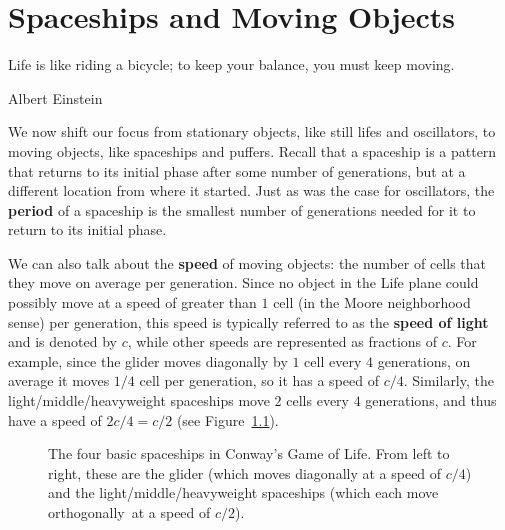 
\renewcommand{\chapterfolder}{spaceships/}
\chapter{Spaceships and Moving Objects}\label{chp:spaceships}


\vspace*{-0.4in}
\epigraph{Life is like riding a bicycle; to keep your balance, you must keep moving.}{Albert Einstein}
\vspace*{0.4in}


\noindent We now shift our focus from stationary objects, like still lifes and oscillators, to moving objects, like spaceships and puffers. Recall that a spaceship is a pattern that returns to its initial phase after some number of generations, but at a different location from where it started. Just as was the case for oscillators, the \textbf{period} of a spaceship is the smallest number of generations needed for it to return to its initial phase.

We can also talk about the \textbf{speed} of moving objects: the number of cells that they move on average per generation. Since no object in the Life plane could possibly move at a speed of greater than $1$ cell (in the Moore neighborhood sense) per generation, this speed is typically referred to as the \textbf{speed of light} and is denoted by $c$, while other speeds are represented as fractions of $c$. For example, since the glider moves diagonally by $1$ cell every $4$ generations, on average it moves $1/4$ cell per generation, so it has a speed of $c/4$. Similarly, the light/middle/heavyweight spaceships move $2$ cells every $4$ generations, and thus have a speed of $2c/4 = c/2$ (see Figure~\ref{fig:basic_spaceships}).

\begin{figure}[!htb]
	\centering
	\caption{The four basic spaceships in Conway's Game of Life. From left to right, these are the glider (which moves diagonally at a speed of $c/4$) and the light/middle/heavyweight spaceships (which each move orthogonally\protect\footnotemark \ at a speed of $c/2$).}\label{fig:basic_spaceships}
\end{figure}

